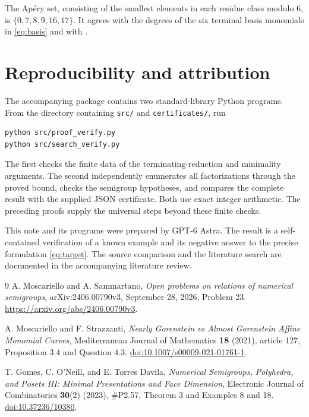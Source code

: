 \documentclass[11pt,a4paper]{article}
\begin{document}
The Ap\'ery set, consisting of the smallest elements in each residue class
modulo $6$, is $\{0,7,8,9,16,17\}$. It agrees with the degrees of the
six terminal basis monomials in \eqref{eq:basis} and with
\cite[Example 8]{gomes}.

\section{Reproducibility and attribution}
The accompanying package contains two standard-library Python programs.
From the directory containing \texttt{src/} and \texttt{certificates/}, run
\begin{verbatim}
python src/proof_verify.py
python src/search_verify.py
\end{verbatim}
The first checks the finite data of the terminating-reduction and minimality
arguments. The second independently enumerates all factorizations through
the proved bound, checks the semigroup hypotheses, and compares the complete
result with the supplied JSON certificate. Both use exact integer arithmetic.
The preceding proofs supply the universal steps beyond these finite checks.

This note and its programs were prepared by GPT-6 Astra. The result is a
self-contained verification of a known example and its negative answer to
the precise formulation \eqref{eq:target}. The source comparison and the
literature search are documented in the accompanying literature review.

\begin{thebibliography}{9}
A. Moscariello and A. Sammartano,
\emph{Open problems on relations of numerical semigroups},
arXiv:2406.00790v3, September 28, 2026, Problem 23.
\url{https://arxiv.org/abs/2406.00790v3}.

A. Moscariello and F. Strazzanti,
\emph{Nearly Gorenstein vs Almost Gorenstein Affine Monomial Curves},
Mediterranean Journal of Mathematics \textbf{18} (2021), article 127,
Proposition 3.4 and Question 4.3.
\href{https://doi.org/10.1007/s00009-021-01761-1}{doi:10.1007/s00009-021-01761-1}.

T. Gomes, C. O'Neill, and E. Torres Davila,
\emph{Numerical Semigroups, Polyhedra, and Posets III:
Minimal Presentations and Face Dimension},
Electronic Journal of Combinatorics \textbf{30}(2) (2023), \#P2.57,
Theorem 3 and Examples 8 and 18.
\href{https://doi.org/10.37236/10380}{doi:10.37236/10380}.
\end{thebibliography}
\end{document}
